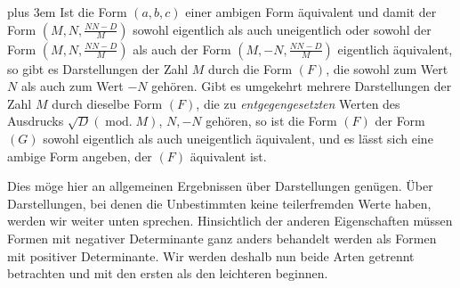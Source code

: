 \begingroup\rightskip=0pt plus 3em\relax
Ist die Form $(a,b,c)$ einer ambigen Form äquivalent und damit der Form $(M,N,\frac{NN-D}{M})$ sowohl eigentlich als auch uneigentlich oder sowohl der Form $(M,N,\frac{NN-D}{M})$ als auch der Form $(M,-N,\frac{NN-D}{M})$ eigentlich äquivalent, so gibt es Darstellungen der Zahl $M$ durch die Form $(F)$, die sowohl zum Wert $N$ als auch zum Wert $-N$ gehören. Gibt es umgekehrt mehrere Darstellungen der Zahl $M$ durch dieselbe Form $(F)$, die zu \emph{entgegengesetzten} Werten des Ausdrucks $\surd D(\operatorname{mod.}M)$, $N,-N$ gehören, so ist die Form $(F)$ der Form $(G)$ sowohl eigentlich als auch uneigentlich äquivalent, und es lässt sich eine ambige Form angeben, der $(F)$ äquivalent ist.
\par\endgroup

Dies möge hier an allgemeinen Ergebnissen über Darstellungen genügen. Über Darstellungen, bei denen die Unbestimmten keine teilerfremden Werte haben, werden wir weiter unten sprechen. Hinsichtlich der anderen Eigenschaften müssen Formen mit negativer Determinante ganz anders behandelt werden als Formen mit positiver Determinante. Wir werden deshalb nun beide Arten getrennt betrachten und mit den ersten als den leichteren beginnen.
